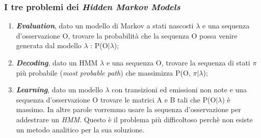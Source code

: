 \subsubsection*{I tre problemi dei \emph{Hidden Markov Models}\cite{8}}
\label{3.3.2.5}
\begin{enumerate}
\item\textbf{\emph{Evaluation}}, dato un modello di Markov a stati nascosti $\lambda$ e una sequenza d'osservazione O, trovare la probabilità che la sequenza O possa venire generata dal modello $\lambda$ : P(O$|\lambda$);
\item\textbf{\emph{Decoding}}, dato un HMM $\lambda$ e una sequenza O, trovare la sequenza di stati $\pi$ più probabile (\emph{most probable path}) che massimizza P(O, $\pi$$|\lambda$);
\item\textbf{\emph{Learning}}, dato un modello $\lambda$ con transizioni ed emissioni non note e una sequenza d'osservazione O trovare le matrici A e B tali che P(O$|\lambda$) è massimo. In altre parole vorremmo usare la sequenza d'osservazione per addestrare un \emph{HMM}. Questo è il problema più difficoltoso perchè non esiste un metodo analitico per la sua soluzione.
\end{enumerate}
